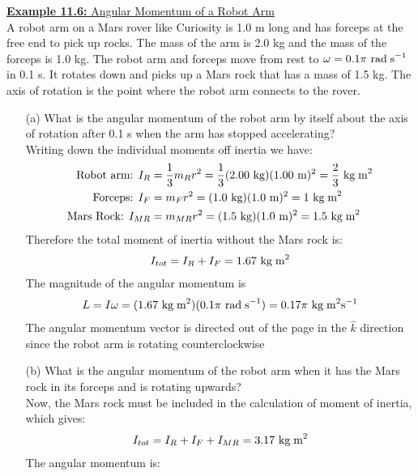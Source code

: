 \documentclass[a4paper]{article}
\let\bf\textbf
\newcommand\rads{\text{ rad\;s}^{-1}}
\newcommand\m{\text{ m}}
\newcommand\kg{\text{ kg}}
\newcommand\kgmm{\text{ kg\;m}^{2}}
\newcommand\kgmms{\text{ kg\;m}^2\text{s}^{-1}}
\begin{document}
\begin{shaded}
    \underline{\bf{Example 11.6:} Angular Momentum of a Robot Arm}
    \vspace{2mm}\\
    A robot arm on a Mars rover like Curiosity is 1.0 m long and has forceps at the free end to pick up rocks. The mass of the arm is 2.0 kg and the mass of the forceps is 1.0 kg. The robot arm and forceps move from rest to $\omega = 0.1\pi\rads$ in 0.1 s. It rotates down and picks up a Mars rock that has a mass of 1.5 kg. The axis of rotation is the point where the robot arm connects to the rover.
    \begin{enumerate}
        \item[(a)] What is the angular momentum of the robot arm by itself about the axis of rotation after 0.1 s when the arm has stopped accelerating?\\
        Writing down the individual moments off inertia we have:
        \begin{align*}
            \text{Robot arm: } I_R &= \frac{1}{3}m_Rr^2 = \frac{1}{3}(2.00\kg)(1.00\m)^2 = \frac{2}{3}\kgmm\\
            \text{Forceps: } I_F &= m_Fr^2 = (1.0\kg)(1.0\m)^2 = 1\kgmm\\
            \text{Mars Rock: } I_{MR} &= m_{MR}r^2 = (1.5\kg)(1.0\m)^2 = 1.5\kgmm
        \end{align*}
        Therefore the total moment of inertia without the Mars rock is:
        \begin{align*}
            I_{tot} = I_R + I_F = 1.67\kgmm
        \end{align*}
        The magnitude of the angular momentum is 
        \begin{align*}
            L = I\omega = (1.67\kgmm)(0.1\pi\rads) = 0.17\pi\kgmms
        \end{align*}
        The angular momentum vector is directed out of the page in the $\hat{k}$ direction since the robot arm is rotating counterclockwise
        \item[(b)] What is the angular momentum of the robot arm when it has the Mars rock in its forceps and is rotating upwards?\\
        Now, the Mars rock must be included in the calculation of moment of inertia, which gives:
        \begin{align*}
            I_{tot} = I_R + I_F + I_{MR} = 3.17\kgmm
        \end{align*}
        The angular momentum is:
        \begin{align*}

\end{align*}
\end{enumerate}
\end{shaded}
\end{document}
